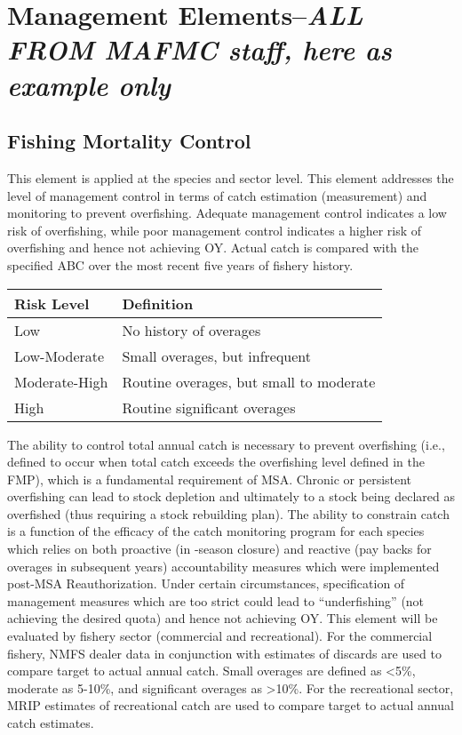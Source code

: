 \documentclass[11pt,]{article}
\begin{document}
\section{\texorpdfstring{Management Elements--\emph{ALL FROM MAFMC
staff, here as example
only}}{Management Elements--ALL FROM MAFMC staff, here as example only}}\label{management-elementsall-from-mafmc-staff-here-as-example-only}

\subsection{Fishing Mortality Control}\label{fishing-mortality-control}

This element is applied at the species and sector level. This element
addresses the level of management control in terms of catch estimation
(measurement) and monitoring to prevent overfishing. Adequate management
control indicates a low risk of overfishing, while poor management
control indicates a higher risk of overfishing and hence not achieving
OY. Actual catch is compared with the specified ABC over the most recent
five years of fishery history.

\begin{longtable}[]{@{}ll@{}}
\toprule
Risk Level & Definition\tabularnewline
\midrule
\endhead
Low & No history of overages\tabularnewline
Low-Moderate & Small overages, but infrequent\tabularnewline
Moderate-High & Routine overages, but small to moderate\tabularnewline
High & Routine significant overages\tabularnewline
\bottomrule
\end{longtable}

The ability to control total annual catch is necessary to prevent
overfishing (i.e., defined to occur when total catch exceeds the
overfishing level defined in the FMP), which is a fundamental
requirement of MSA. Chronic or persistent overfishing can lead to stock
depletion and ultimately to a stock being declared as overfished (thus
requiring a stock rebuilding plan). The ability to constrain catch is a
function of the efficacy of the catch monitoring program for each
species which relies on both proactive (in -season closure) and reactive
(pay backs for overages in subsequent years) accountability measures
which were implemented post-MSA Reauthorization. Under certain
circumstances, specification of management measures which are too strict
could lead to ``underfishing'' (not achieving the desired quota) and
hence not achieving OY. This element will be evaluated by fishery sector
(commercial and recreational). For the commercial fishery, NMFS dealer
data in conjunction with estimates of discards are used to compare
target to actual annual catch. Small overages are defined as
\textless{}5\%, moderate as 5-10\%, and significant overages as
\textgreater{}10\%. For the recreational sector, MRIP estimates of
recreational catch are used to compare target to actual annual catch
estimates.
\end{document}
